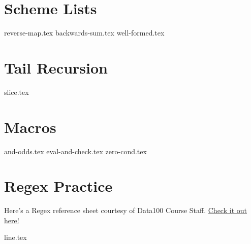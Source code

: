 \documentclass{exam}
\begin{document}
\section{Scheme Lists}
\begin{questions}
{reverse-map.tex}
{backwards-sum.tex}
{well-formed.tex}

\section{Tail Recursion}
{slice.tex}

\section{Macros}
{and-odds.tex}
{eval-and-check.tex}
{zero-cond.tex}

\newpage
\section{Regex Practice}
Here's a Regex reference sheet courtesy of Data100 Course Staff. \href{https://drive.google.com/file/d/1lhIy1fIJZKXeIZYGv4ltkFMwq0OxdKNn/view?usp=sharing}{Check it out here!}

{line.tex}

\end{questions}
\end{document}
